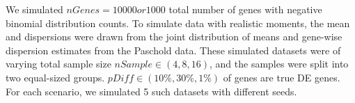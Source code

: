 We simulated $nGenes=10000 or 1000$ total number of genes with negative binomial distribution counts. To simulate data with realistic moments, the mean and dispersions were drawn from the joint distribution of means and gene-wise dispersion estimates from the Paschold data. These simulated datasets were of varying total sample size $nSample \in {(4,8,16)}$, and the samples were split into two equal-sized groups. $pDiff \in {(10\%, 30\%, 1\%)}$ of genes are true DE genes. For each scenario, we simulated 5 such datasets with different seeds.









